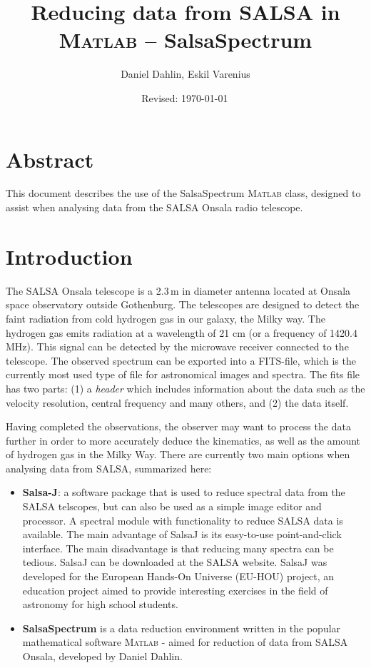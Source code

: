 \documentclass[11pt,a4paper]{article}
\begin{document}
\pagestyle{plain}
\title{\textsf{Reducing data from SALSA in \textsc{Matlab} -- {SalsaSpectrum}}}
\author{\textsf{Daniel Dahlin, Eskil Varenius}}
\yyyymmdddate
\date{\textsf{Revised: \today \, \currenttime}}
 

\maketitle

\section*{Abstract}
This document describes the use of the SalsaSpectrum \textsc{Matlab}
class, designed to assist when analysing data from the SALSA Onsala 
radio telescope. 

\tableofcontents

\section{Introduction}
\label{sec:introduction}

The SALSA Onsala telescope is a 2.3\,m in diameter antenna located at
Onsala space observatory outside Gothenburg. The telescopes are
designed to detect the faint radiation from cold hydrogen gas in our
galaxy, the Milky way. The hydrogen gas emits radiation at a
wavelength of 21 cm (or a frequency of 1420.4 MHz). This signal can be
detected by the microwave receiver connected to the telescope. 
The observed spectrum can be
exported into a FITS-file, which is the currently most used type of
file for astronomical images and spectra. The fits file has two parts:
(1) a \emph{header} which includes information
about the data such as the velocity resolution, central frequency and
many others, and (2) the data itself.

Having completed the observations, the observer may want to process
the data further in order to more accurately deduce the kinematics,
as well as the amount of hydrogen gas in the Milky Way. There are
currently two main options when analysing data from SALSA,
summarized here:

\begin{itemize}
\item \textbf{Salsa-J}: a software package that is used to reduce
  spectral data from the SALSA telscopes, but can also be used as a
  simple image editor and processor. A spectral module with
  functionality to reduce SALSA data is available. The main advantage
  of SalsaJ is its easy-to-use point-and-click interface. The main
  disadvantage is that reducing many spectra can be tedious. SalsaJ
  can be downloaded at the SALSA website. SalsaJ was developed for 
  the European Hands-On Universe (EU-HOU) project, an
  education project aimed to provide interesting exercises in the
  field of astronomy for high school students.
\item \textbf{SalsaSpectrum} is a data reduction environment written
  in the popular mathematical software \textsc{\textsc{Matlab}} -
  aimed for reduction of data from SALSA Onsala, developed by Daniel
  Dahlin.
\end{itemize}
\end{document}
